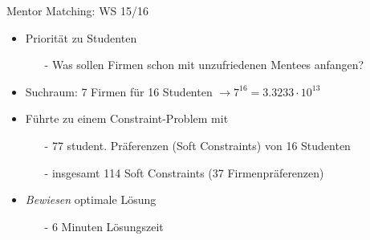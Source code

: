 \begin{frame}[fragile]{Mentor Matching: WS 15/16}
\begin{itemize}
\item Priorität zu \alert{Studenten}
\begin{itemize}
\item[-] Was sollen Firmen schon mit unzufriedenen Mentees anfangen?
\end{itemize}
\item Suchraum: 7 Firmen für 16 Studenten $\rightarrow 7^{16} = 3.3233 \cdot 10^{13}$
\vspace*{2ex}
\item Führte zu einem Constraint-Problem mit
\begin{itemize}
\item[-] 77 student. Präferenzen (Soft Constraints) von 16 Studenten
\item[-] insgesamt 114 Soft Constraints (37 Firmenpräferenzen) 
\end{itemize}

\vspace*{2ex}

\item \emph{Bewiesen} optimale Lösung
\begin{itemize}
\item[-] 6 Minuten Lösungszeit
\end{itemize}
\end{itemize}
\end{frame}



